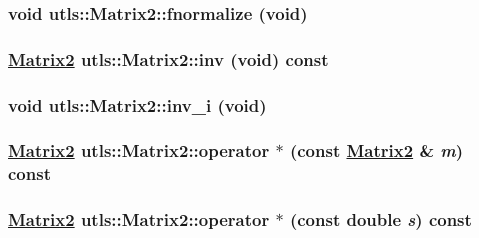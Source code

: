 \hypertarget{classutls_1_1Matrix2_765400f990b04b2b7bec92c4debe35e1}{
\subsubsection[fnormalize]{\setlength{\rightskip}{0pt plus 5cm}void utls::Matrix2::fnormalize (void)}}
\label{classutls_1_1Matrix2_765400f990b04b2b7bec92c4debe35e1}


\hypertarget{classutls_1_1Matrix2_24e744e0d3e3406e7dd44a22ec41431a}{
\subsubsection[inv]{\setlength{\rightskip}{0pt plus 5cm}\hyperlink{classutls_1_1Matrix2}{Matrix2} utls::Matrix2::inv (void) const}}
\label{classutls_1_1Matrix2_24e744e0d3e3406e7dd44a22ec41431a}


\hypertarget{classutls_1_1Matrix2_06ff4b24c33852e291de85042020bff3}{
\subsubsection[inv\_\-i]{\setlength{\rightskip}{0pt plus 5cm}void utls::Matrix2::inv\_\-i (void)}}
\label{classutls_1_1Matrix2_06ff4b24c33852e291de85042020bff3}


\hypertarget{classutls_1_1Matrix2_52a4fa4aa57879987d7e85f16235c451}{
\subsubsection[operator $\ast$]{\setlength{\rightskip}{0pt plus 5cm}\hyperlink{classutls_1_1Matrix2}{Matrix2} utls::Matrix2::operator $\ast$ (const \hyperlink{classutls_1_1Matrix2}{Matrix2} \& {\em m}) const}}
\label{classutls_1_1Matrix2_52a4fa4aa57879987d7e85f16235c451}


\hypertarget{classutls_1_1Matrix2_ee01e0dc39782f92f955b33cbcdb77aa}{
\subsubsection[operator $\ast$]{\setlength{\rightskip}{0pt plus 5cm}\hyperlink{classutls_1_1Matrix2}{Matrix2} utls::Matrix2::operator $\ast$ (const double {\em s}) const}}
\label{classutls_1_1Matrix2_ee01e0dc39782f92f955b33cbcdb77aa}


